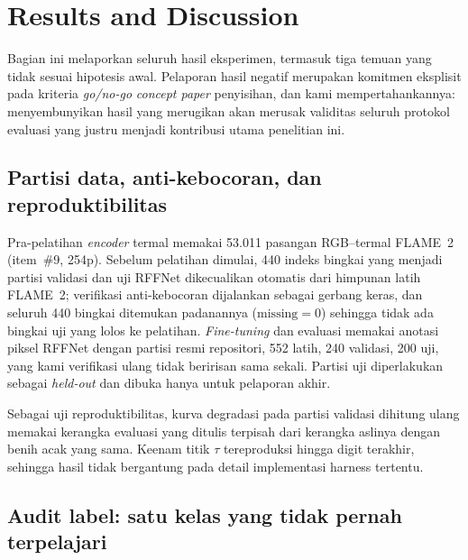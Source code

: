 %


\section{Results and Discussion}

Bagian ini melaporkan seluruh hasil eksperimen, termasuk tiga temuan yang tidak
sesuai hipotesis awal. Pelaporan hasil negatif merupakan komitmen eksplisit pada
kriteria \emph{go/no-go} \emph{concept paper} penyisihan, dan kami
mempertahankannya: menyembunyikan hasil yang merugikan akan merusak validitas
seluruh protokol evaluasi yang justru menjadi kontribusi utama penelitian ini.

\subsection{Partisi data, anti-kebocoran, dan reproduktibilitas}

Pra-pelatihan \emph{encoder} termal memakai 53.011 pasangan RGB--termal FLAME~2
(item~\#9, 254p). Sebelum pelatihan dimulai, 440 indeks bingkai yang menjadi
partisi validasi dan uji RFFNet dikecualikan otomatis dari himpunan latih
FLAME~2; verifikasi anti-kebocoran dijalankan sebagai gerbang keras, dan seluruh
440 bingkai ditemukan padanannya ($\text{missing} = 0$) sehingga tidak ada
bingkai uji yang lolos ke pelatihan. \emph{Fine-tuning} dan evaluasi memakai
anotasi piksel RFFNet dengan partisi resmi repositori, 552 latih, 240 validasi,
200 uji, yang kami verifikasi ulang tidak beririsan sama sekali. Partisi uji
diperlakukan sebagai \emph{held-out} dan dibuka hanya untuk pelaporan akhir.

Sebagai uji reproduktibilitas, kurva degradasi pada partisi validasi dihitung
ulang memakai kerangka evaluasi yang ditulis terpisah dari kerangka aslinya
dengan benih acak yang sama. Keenam titik $\tau$ tereproduksi hingga digit
terakhir, sehingga hasil tidak bergantung pada detail implementasi harness
tertentu.

\subsection{Audit label: satu kelas yang tidak pernah terpelajari}


